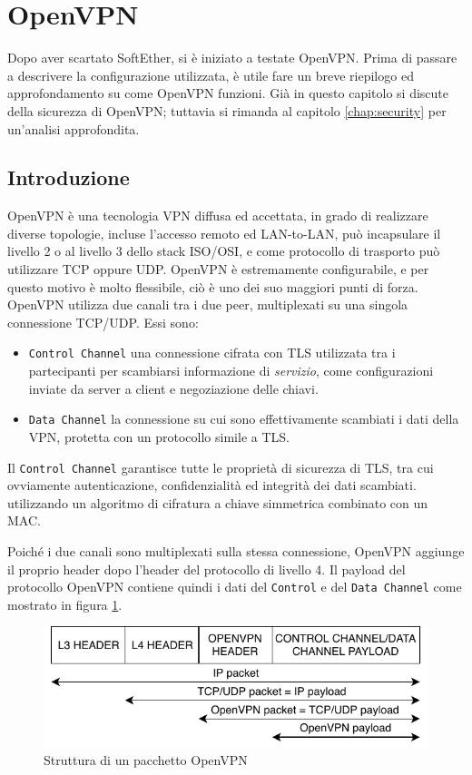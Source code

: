 \section{OpenVPN}
Dopo aver scartato SoftEther, si è iniziato a testate OpenVPN. Prima di passare a
descrivere la configurazione
utilizzata, è utile fare un breve riepilogo ed approfondamento su come OpenVPN
funzioni. Già in questo capitolo si discute della sicurezza di OpenVPN; tuttavia
si rimanda al capitolo \ref{chap:security} per un'analisi approfondita.

\subsection{Introduzione}
OpenVPN è una tecnologia VPN diffusa ed accettata, in grado di realizzare
diverse topologie, incluse l'accesso remoto ed LAN-to-LAN, può incapsulare il
livello 2 o al livello 3 dello stack ISO/OSI, e come protocollo di trasporto
può utilizzare TCP oppure UDP. OpenVPN è estremamente configurabile, e per questo
motivo è molto flessibile, ciò è uno dei suo maggiori punti di forza.\\
OpenVPN utilizza due canali tra i due peer, multiplexati su una singola connessione
TCP/UDP. Essi sono:
\begin{itemize}
	\item \texttt{Control Channel} una connessione cifrata con TLS utilizzata tra i
	      partecipanti per scambiarsi informazione di \textit{servizio}, come configurazioni
	      inviate da server a client e negoziazione delle chiavi.
	\item \texttt{Data Channel} la connessione su cui sono effettivamente scambiati
	      i dati della VPN, protetta con un protocollo simile a TLS.
\end{itemize}
Il \texttt{Control Channel} garantisce tutte le proprietà di sicurezza di TLS,
tra cui ovviamente autenticazione, confidenzialità ed integrità
dei dati scambiati.
utilizzando un algoritmo di cifratura a chiave simmetrica combinato
con un MAC.

Poiché i due canali sono multiplexati sulla stessa connessione, OpenVPN aggiunge
il proprio header dopo l'header del protocollo di livello 4. Il payload del
protocollo OpenVPN contiene quindi i dati del \texttt{Control}
e del \texttt{Data Channel} come mostrato in figura \ref{fig:openvpn-tunnelling}.

\begin{figure}[h!]
	\includegraphics[scale=0.85]{img/openvpn_tunnelling}
	\caption{Struttura di un pacchetto OpenVPN}
	\label{fig:openvpn-tunnelling}
\end{figure}

